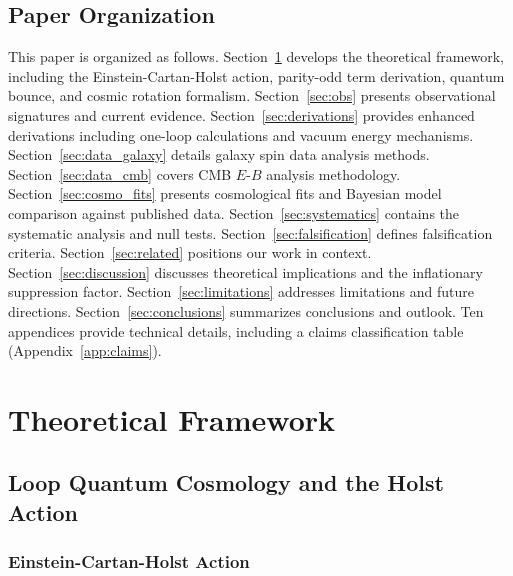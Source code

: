 \documentclass[aps,prd,twocolumn,superscriptaddress,showpacs,preprintnumbers,nofootinbib,longbibliography,floatfix]{revtex4-2}
\begin{document}
\subsection{Paper Organization}

This paper is organized as follows. Section~\ref{sec:theory} develops the theoretical framework, including the Einstein-Cartan-Holst action, parity-odd term derivation, quantum bounce, and cosmic rotation formalism. Section~\ref{sec:obs} presents observational signatures and current evidence. Section~\ref{sec:derivations} provides enhanced derivations including one-loop calculations and vacuum energy mechanisms. Section~\ref{sec:data_galaxy} details galaxy spin data analysis methods. Section~\ref{sec:data_cmb} covers CMB $E$-$B$ analysis methodology. Section~\ref{sec:cosmo_fits} presents cosmological fits and Bayesian model comparison against published data. Section~\ref{sec:systematics} contains the systematic analysis and null tests. Section~\ref{sec:falsification} defines falsification criteria. Section~\ref{sec:related} positions our work in context. Section~\ref{sec:discussion} discusses theoretical implications and the inflationary suppression factor. Section~\ref{sec:limitations} addresses limitations and future directions. Section~\ref{sec:conclusions} summarizes conclusions and outlook. Ten appendices provide technical details, including a claims classification table (Appendix~\ref{app:claims}).


\section{Theoretical Framework}\label{sec:theory}

\subsection{Loop Quantum Cosmology and the Holst Action}\label{sec:holst}

\subsubsection{Einstein-Cartan-Holst Action}
\end{document}
